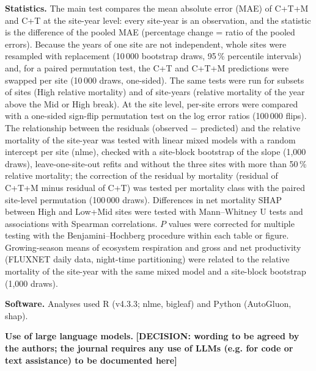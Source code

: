 \documentclass[11pt,a4paper]{article}
\newcommand{\decide}[1]{\textcolor{red!75!black}{\textbf{[DECISION: #1]}}}
\begin{document}
\textbf{Statistics.} The main test compares the mean absolute error (MAE) of C+T+M and C+T at the site-year level: every
site-year is an observation, and the statistic is the difference of the pooled MAE (percentage change = ratio of the pooled
errors). Because the years of one site are not independent, whole sites were resampled with replacement (10\,000 bootstrap draws,
95\,\% percentile intervals) and, for a paired permutation test, the C+T and C+T+M predictions were swapped per site
(10\,000 draws, one-sided). The same tests were run for subsets of sites (High relative mortality) and of site-years (relative mortality
of the year above the Mid or High break). At the site level, per-site errors were compared with a one-sided sign-flip permutation
test on the log error ratios (100\,000 flips). The relationship between the residuals (observed $-$ predicted) and the relative
mortality of the site-year was tested with linear mixed models with a random intercept per site (nlme\cite{pinheiro2000mixed}),
checked with a site-block bootstrap of the slope (1,000 draws), leave-one-site-out refits and without the three sites with more
than 50\,\% relative mortality; the correction of the residual by mortality (residual of C+T+M minus residual of C+T) was tested per
mortality class with the paired site-level permutation (100\,000 draws). Differences in net mortality SHAP between High and
Low+Mid sites were tested with Mann--Whitney U tests and associations with Spearman correlations. $P$ values were corrected for
multiple testing with the Benjamini--Hochberg procedure\cite{benjamini1995controlling} within each table or figure. Growing-season means of ecosystem respiration and gross and net productivity (FLUXNET daily
data, night-time partitioning) were related to the relative mortality of the site-year with the same mixed model and a
site-block bootstrap (1,000 draws).

\textbf{Software.} Analyses used R\cite{rcore2024} (v4.3.3; nlme, bigleaf) and Python (AutoGluon, shap).

\textbf{Use of large language models.} \decide{wording to be agreed by the authors; the journal requires any use of LLMs (e.g.
for code or text assistance) to be documented here}
\end{document}
